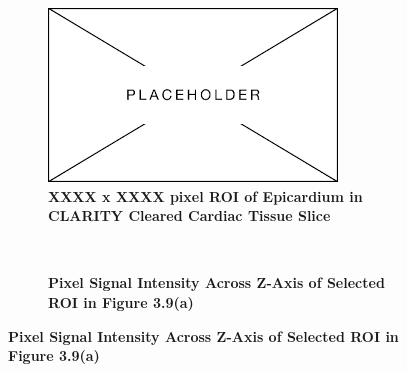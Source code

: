 \begin{figure}[H]
    \centering
    \begin{subfigure}[t]{0.475\textwidth}
    \centering
    \includegraphics[width=1\linewidth]{Figures/Placeholder.png}
    \caption{\textbf{XXXX x XXXX pixel ROI of Epicardium in CLARITY Cleared Cardiac Tissue Slice}}
    \end{subfigure}
    ~
    \begin{subfigure}[t]{0.475\textwidth}
    \centering
    \caption{\textbf{Pixel Signal Intensity Across Z-Axis of Selected ROI in Figure 3.9(a)}}
    \label{fig:enter-label}
    \end{subfigure}
    \medskip
    

\end{figure}
